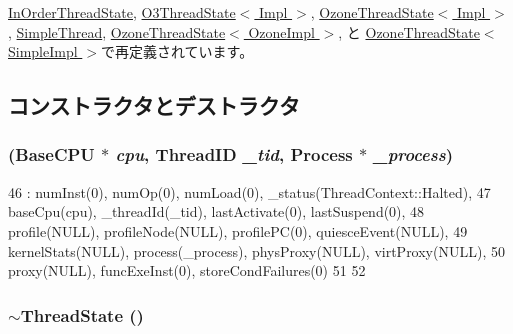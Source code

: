 \hyperlink{classInOrderThreadState_a3af29dcea6d2bbb0a1de56f02ec789f1}{InOrderThreadState}, \hyperlink{structO3ThreadState_a3af29dcea6d2bbb0a1de56f02ec789f1}{O3ThreadState$<$ Impl $>$}, \hyperlink{structOzoneThreadState_a3af29dcea6d2bbb0a1de56f02ec789f1}{OzoneThreadState$<$ Impl $>$}, \hyperlink{classSimpleThread_a3af29dcea6d2bbb0a1de56f02ec789f1}{SimpleThread}, \hyperlink{structOzoneThreadState_a3af29dcea6d2bbb0a1de56f02ec789f1}{OzoneThreadState$<$ OzoneImpl $>$}, と \hyperlink{structOzoneThreadState_a3af29dcea6d2bbb0a1de56f02ec789f1}{OzoneThreadState$<$ SimpleImpl $>$}で再定義されています。

\subsection{コンストラクタとデストラクタ}
\hypertarget{structThreadState_afc2e5271f3b004bc94ed9d151e3d55d0}{
\subsubsection[{ThreadState}]{ ({\bf BaseCPU} $\ast$ {\em cpu}, \/  {\bf ThreadID} {\em \_\-tid}, \/  {\bf Process} $\ast$ {\em \_\-process})}}
\label{structThreadState_afc2e5271f3b004bc94ed9d151e3d55d0}



\begin{DoxyCode}
46     : numInst(0), numOp(0), numLoad(0), _status(ThreadContext::Halted),
47       baseCpu(cpu), _threadId(_tid), lastActivate(0), lastSuspend(0),
48       profile(NULL), profileNode(NULL), profilePC(0), quiesceEvent(NULL),
49       kernelStats(NULL), process(_process), physProxy(NULL), virtProxy(NULL),
50       proxy(NULL), funcExeInst(0), storeCondFailures(0)
51 {
52 }
\end{DoxyCode}
\hypertarget{structThreadState_aea639dd2849f4339b36b5e5a28a82613}{
\subsubsection[{$\sim$ThreadState}]{\setlength{\rightskip}{0pt plus 5cm}$\sim${\bf ThreadState} ()}}
\label{structThreadState_aea639dd2849f4339b36b5e5a28a82613}



